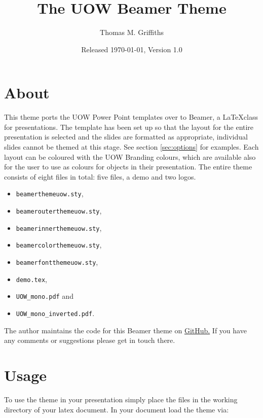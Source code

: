 \documentclass[a4paper,oneside,12pt]{article}
\title{\textsf{The UOW Beamer Theme}}
\author{Thomas M. Griffiths}
\date{Released \today, Version 1.0}
\begin{document}
\maketitle

\section{About}
This theme ports the UOW Power Point templates over to Beamer, a \LaTeX class for presentations. The template has been set up so that the layout for the entire presentation is selected and the slides are formatted as appropriate, individual slides cannot be themed at this stage. See section \ref{sec:options} for examples. Each layout can be coloured with the UOW Branding colours, which are available also for the user to use as colours for objects in their presentation. The entire theme consists of eight files in total: five files, a demo and two logos. 
\begin{multicols}{2}
\begin{itemize}
   \item \texttt{\colorbox{UOWgrey!20}{beamerthemeuow.sty}},
   \item \texttt{\colorbox{UOWgrey!20}{beamerouterthemeuow.sty}},
   \item \texttt{\colorbox{UOWgrey!20}{beamerinnerthemeuow.sty}},
   \item \texttt{\colorbox{UOWgrey!20}{beamercolorthemeuow.sty}},
   \item \texttt{\colorbox{UOWgrey!20}{beamerfontthemeuow.sty}},
   \item \texttt{\colorbox{UOWgrey!20}{demo.tex}},
   \item \texttt{\colorbox{UOWgrey!20}{UOW\_mono.pdf}} and
   \item \texttt{\colorbox{UOWgrey!20}{UOW\_mono\_inverted.pdf}}.
\end{itemize}
\end{multicols}

The author maintains the code for this Beamer theme on \href{https://github.com/tmgriffiths/UOW_Beamer}{GitHub.} If you have any comments or suggestions please get in touch there.

\section{Usage}
To use the theme in your presentation simply place the files in the working directory of your latex document. In your document load the theme via:\\
\end{document}
